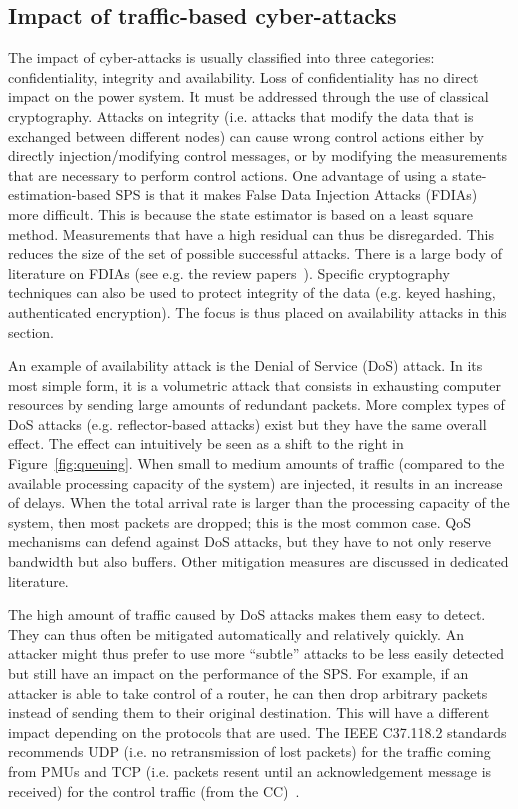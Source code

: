 \subsection{Impact of traffic-based cyber-attacks}
\label{sec:ICTtrafficAttack}

The impact of cyber-attacks is usually classified into three categories: confidentiality, integrity and availability. Loss of confidentiality has no direct impact on the power system. It must be addressed through the use of classical cryptography. Attacks on integrity (i.e. attacks that modify the data that is exchanged between different nodes) can cause wrong control actions either by directly injection/modifying control messages, or by modifying the measurements that are necessary to perform control actions. One advantage of using a state-estimation-based SPS is that it makes False Data Injection Attacks (FDIAs) more difficult. This is because the state estimator is based on a least square method. Measurements that have a high residual can thus be disregarded. This reduces the size of the set of possible successful attacks. There is a large body of literature on FDIAs (see e.g. the review papers~\cite{FDIAreview, FDIAreview2}). Specific cryptography techniques can also be used to protect integrity of the data (e.g. keyed hashing, authenticated encryption). The focus is thus placed on availability attacks in this section.

An example of availability attack is the Denial of Service (DoS) attack. In its most simple form, it is a volumetric attack that consists in exhausting computer resources by sending large amounts of redundant packets. More complex types of DoS attacks (e.g. reflector-based attacks) exist but they have the same overall effect. The effect can intuitively be seen as a shift to the right in Figure~\ref{fig:queuing}. When small to medium amounts of traffic (compared to the available processing capacity of the system) are injected, it results in an increase of delays. When the total arrival rate is larger than the processing capacity of the system, then most packets are dropped; this is the most common case. QoS mechanisms can defend against DoS attacks, but they have to not only reserve bandwidth but also buffers. Other mitigation measures are discussed in dedicated literature.

The high amount of traffic caused by DoS attacks makes them easy to detect. They can thus often be mitigated automatically and relatively quickly. An attacker might thus prefer to use more ``subtle'' attacks to be less easily detected but still have an impact on the performance of the SPS. For example, if an attacker is able to take control of a router, he can then drop arbitrary packets instead of sending them to their original destination. This will have a different impact depending on the protocols that are used. The IEEE C37.118.2 standards recommends UDP (i.e. no retransmission of lost packets) for the traffic coming from PMUs and TCP (i.e. packets resent until an acknowledgement message is received) for the control traffic (from the CC)~\cite{StandardC37-118-2}.

